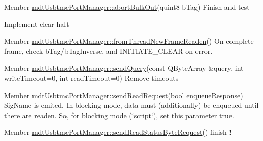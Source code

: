 \label{todo__todo000038}
\hypertarget{todo__todo000038}{}
 
\begin{DoxyDescription}
\item[Member \hyperlink{classmdt_usbtmc_port_manager_af412ba1b1e7e56ebecd2e59cb6bf607a}{mdtUsbtmcPortManager::abortBulkOut}(quint8 bTag) ]Finish and test 

Implement clear halt 
\end{DoxyDescription}

\label{todo__todo000040}
\hypertarget{todo__todo000040}{}
 
\begin{DoxyDescription}
\item[Member \hyperlink{classmdt_usbtmc_port_manager_aca42b343ae1f6a324e6e45968f03bbea}{mdtUsbtmcPortManager::fromThreadNewFrameReaden}() ]On complete frame, check bTag/bTagInverse, and INITIATE\_\-CLEAR on error. 
\end{DoxyDescription}

\label{todo__todo000036}
\hypertarget{todo__todo000036}{}
 
\begin{DoxyDescription}
\item[Member \hyperlink{classmdt_usbtmc_port_manager_a858590909ce63319a3390140c4d0a6ca}{mdtUsbtmcPortManager::sendQuery}(const QByteArray \&query, int writeTimeout=0, int readTimeout=0) ]Remove timeouts 
\end{DoxyDescription}

\label{todo__todo000041}
\hypertarget{todo__todo000041}{}
 
\begin{DoxyDescription}
\item[Member \hyperlink{classmdt_usbtmc_port_manager_ab1604a1c8f2e9192714d039dbf9a5158}{mdtUsbtmcPortManager::sendReadRequest}(bool enqueueResponse) ]SigName is emited. In blocking mode, data must (additionally) be enqueued until there are readen. So, for blocking mode (\char`\"{}script\char`\"{}), set this parameter true. 
\end{DoxyDescription}

\label{todo__todo000037}
\hypertarget{todo__todo000037}{}
 
\begin{DoxyDescription}
\item[Member \hyperlink{classmdt_usbtmc_port_manager_a7bcc280bd4a26ed523832550b1e61553}{mdtUsbtmcPortManager::sendReadStatusByteRequest}() ]finish ! 
\end{DoxyDescription}